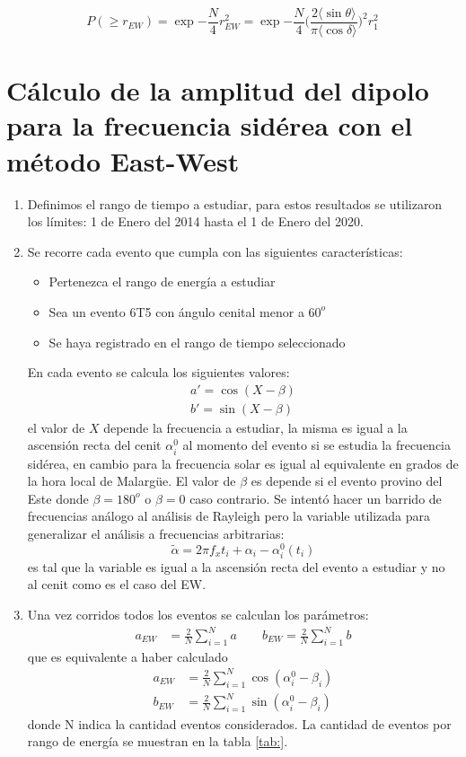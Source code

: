 \begin{equation}
    P(\geq r_{EW}) = \exp{-\frac{N}{4}r^2_{EW}} = \exp{-\frac{N}{4} \Big ( \frac{2 \langle\sin\theta \rangle }{\pi \langle\cos\delta \rangle} \Big)^2 r^2_{1} }
\end{equation}


\section{Cálculo de la amplitud del dipolo para la frecuencia sidérea con el método East-West}

\begin{enumerate}
    \item Definimos el rango de tiempo a estudiar, para estos resultados se utilizaron los límites: 1 de Enero del 2014 hasta el 1 de Enero del 2020.
    \item Se recorre cada evento que cumpla con las siguientes características:
     \begin{itemize}
        \item Pertenezca el rango de energía a estudiar
        \item Sea un evento 6T5 con ángulo cenital menor a $60^o$
        \item Se haya registrado en el rango de tiempo seleccionado
    \end{itemize}
    En cada evento se calcula los siguientes valores:
    \begin{align}
        a' = \cos(X - \beta)\\
        b' = \sin(X - \beta)
    \end{align}
    el valor de $X$ depende la frecuencia a estudiar, la misma es igual a la ascensión recta del cenit $\alpha^0_i$ al momento del evento  si se estudia la frecuencia sidérea, en cambio para la frecuencia solar es igual al equivalente en grados de la hora local de Malargüe. El valor de $\beta$ es depende si el evento provino del Este donde $\beta=180^o$ o $\beta=0$ caso contrario.
    Se intentó hacer un barrido de frecuencias análogo al análisis de Rayleigh pero la variable utilizada para generalizar el análisis a frecuencias arbitrarias:
    \begin{equation}
        \tilde{\alpha} = 2\pi f_x t_i + \alpha_i - \alpha_i^0(t_i) \label{ra_mod}
      \end{equation}
    es tal que la variable es igual a la ascensión recta del evento a estudiar y no al cenit como es el caso del EW. 
    \item Una vez corridos todos los  eventos se calculan los parámetros:
    \begin{align*}
        a_{EW} &= \frac{2}{N} \sum^N_{i=1} a \qquad
        b_{EW} = \frac{2}{N} \sum^N_{i=1} b
    \end{align*}
    que es equivalente a haber calculado
    \begin{align*}
        a_{EW} &= \frac{2}{N} \sum^N_{i=1} \cos(\alpha^0_i - \beta_i)\\
        b_{EW} &= \frac{2}{N} \sum^N_{i=1} \sin(\alpha^0_i - \beta_i)
    \end{align*}
    donde N indica la cantidad eventos considerados. La cantidad de eventos por rango de energía se muestran en la tabla \ref{tab:}.


\end{enumerate}
